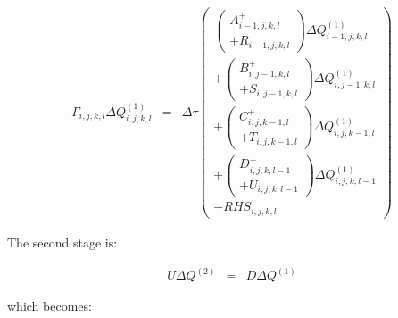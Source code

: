 \begin{eqnarray}
\Gamma_{i,j,k,l} 
\Delta Q_{i,j,k,l}^{\left(1 \right)}
&=&
\Delta \tau
\left(
\begin{array}{r}
  \left(
\begin{array}{r}
A^+_{i-1,j,k,l} 
\\
+ R_{i-1,j,k,l} 
\end{array}
\right) \Delta Q_{i-1,j,k,l}^{\left(1 \right)}
\\
+ \left(
\begin{array}{r}
B^+_{i,j-1,k,l} 
\\
+ S_{i,j-1,k,l} 
\end{array}
\right) \Delta Q_{i,j-1,k,l}^{\left(1 \right)}
\\
+ \left(
\begin{array}{r}
C^+_{i,j,k-1,l} 
\\
+ T_{i,j,k-1,l} 
\end{array}
\right) \Delta Q_{i,j,k-1,l}^{\left(1 \right)}
\\
+ \left(
\begin{array}{r}
D^+_{i,j,k,l-1} 
\\
+ U_{i,j,k,l-1} 
\end{array}
\right) \Delta Q_{i,j,k,l-1}^{\left(1 \right)}
\\
-RHS_{i,j,k,l}
\end{array}
\right)
\nonumber
\end{eqnarray}

The second stage is:

\begin{eqnarray}
U \Delta Q^{\left(2 \right)} &=& D \Delta Q^{\left(1 \right)}
\nonumber
\end{eqnarray}

which becomes:

